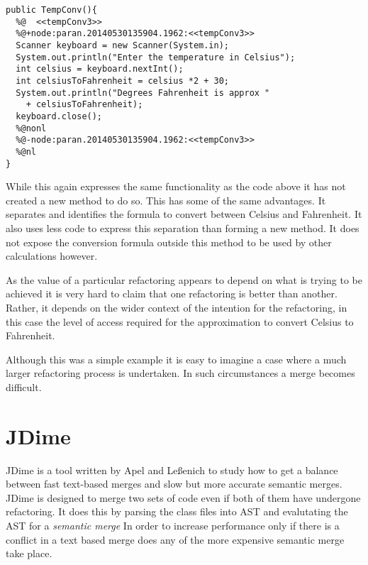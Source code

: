 \begin{minipage}[t]{1.0\textwidth}
\begin{lstlisting}
public TempConv(){
  %@  <<tempConv3>>
  %@+node:paran.20140530135904.1962:<<tempConv3>>
  Scanner keyboard = new Scanner(System.in);
  System.out.println("Enter the temperature in Celsius");
  int celsius = keyboard.nextInt();
  int celsiusToFahrenheit = celsius *2 + 30;
  System.out.println("Degrees Fahrenheit is approx " 
    + celsiusToFahrenheit);
  keyboard.close();
  %@nonl
  %@-node:paran.20140530135904.1962:<<tempConv3>>
  %@nl
}
\end{lstlisting}
\end{minipage}

While this again expresses the same functionality as the code above it has not created a new method to do so. This has some of the same advantages. It separates and identifies the formula to convert between Celsius and Fahrenheit. It also uses less code to express this separation than forming a new method. It does not expose the conversion formula outside this method to be used by other calculations however.

As the value of a particular refactoring appears to depend on what is trying to be achieved it is very hard to claim that one refactoring is better than another. Rather, it depends on the wider context of the intention for the refactoring, in this case the level of access required for the approximation to convert Celsius to Fahrenheit.

Although this was a simple example it is easy to imagine a case where a much larger refactoring process is undertaken. In such circumstances a merge becomes difficult. 

\section{JDime}

JDime is a tool written by  Apel and Le{\ss}enich \cite{Apel2012} \cite{Apel2011} \cite{LeBenich2012} to study how to get a balance between fast text-based merges and slow but more accurate semantic merges.  JDime is designed to merge two sets of code even if both of them have undergone refactoring. It does this by parsing the class files into AST and evalutating the AST for a \emph{semantic merge} In order to increase performance only if there is a conflict in a text based merge does any of the more expensive semantic merge take place. 

